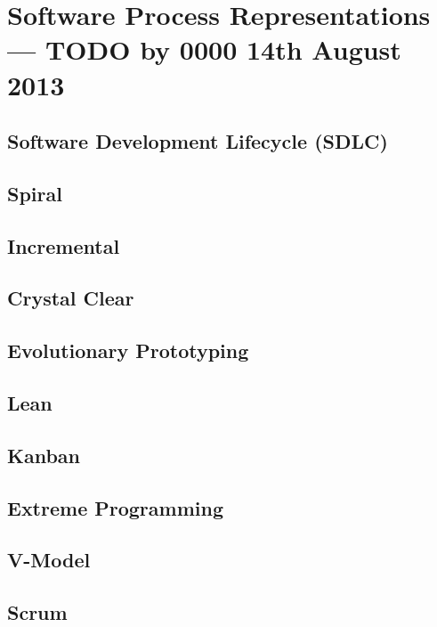 \section{Software Process Representations--- TODO by 0000 14th August 2013} \label{diagrams}

\subsection{Software Development Lifecycle (SDLC)}

\subsection{Spiral}

\subsection{Incremental}

\subsection{Crystal Clear}

\subsection{Evolutionary Prototyping}

\subsection{Lean}

\subsection{Kanban}

\subsection{Extreme Programming}

\subsection{V-Model}

\subsection{Scrum}
